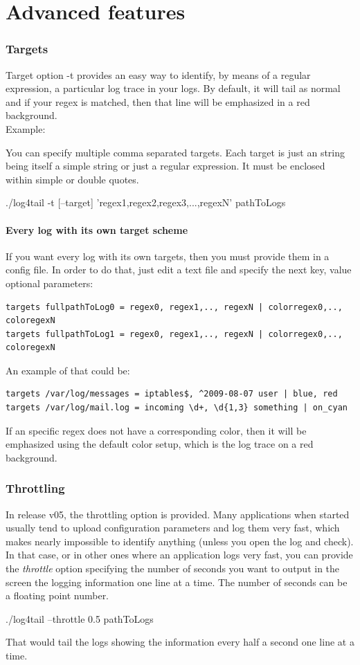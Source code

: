 \part{Advanced features}
\section{Targets}
\label{sec:Targets} Target option -t provides an easy way to identify, by means of a regular
expression, a particular log trace in your logs. By default, it will tail as
normal and if your regex is matched, then that line will be emphasized in a red
background.\\
Example:\\

You can specify multiple comma separated targets. Each target is just an string being 
itself a simple string or just a regular expression. It must be enclosed within simple or 
double quotes.
\begin{cmd}
 ./log4tail -t [--target] 'regex1,regex2,regex3,...,regexN' pathToLogs
\end{cmd}

\subsection{Every log with its own target scheme}
If you want every log with its own targets, then you must provide them in a config file. 
In order to do that, just edit a text file and specify the next key, value optional parameters:
\begin{verbatim}
targets fullpathToLog0 = regex0, regex1,.., regexN | colorregex0,.., coloregexN
targets fullpathToLog1 = regex0, regex1,.., regexN | colorregex0,.., coloregexN
\end{verbatim}
An example of that could be:
\begin{verbatim}
targets /var/log/messages = iptables$, ^2009-08-07 user | blue, red
targets /var/log/mail.log = incoming \d+, \d{1,3} something | on_cyan
\end{verbatim}
If an specific regex does not have a corresponding color, then it will be emphasized using
the default color setup, which is the log trace on a red background.



\section{Throttling}
In release v05, the throttling option is provided. Many applications when
started usually tend to upload configuration parameters and log them very fast,
which makes nearly impossible to identify anything (unless you open the log and
check). In that case, or in other ones where an application logs very fast, you
can provide the \emph{throttle} option specifying the number of seconds you want
to output in the screen the logging information one line at a time. The number 
of seconds can be a floating point number.
\begin{cmd}
 ./log4tail --throttle 0.5 pathToLogs
\end{cmd}
That would tail the logs showing the information every half a second one line at 
a time.


